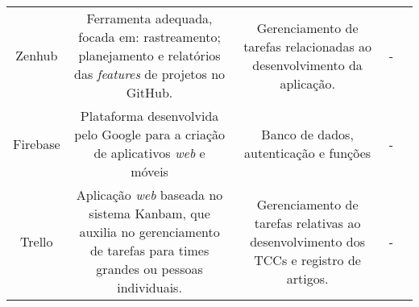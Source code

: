 \begin{table}[]
	\begin{tabular}{|c|c|c|c|c}
	\cline{1-4}
	\cellcolor[HTML]{EFEFEF}\begin{minipage} [t] {0.3\textwidth} \centering  Zenhub \cite{zenhub2020} \end{minipage} & \cellcolor[HTML]{EFEFEF}\begin{minipage} [t] {0.3\textwidth} \centering   Ferramenta adequada, focada em: rastreamento; planejamento e relatórios das \emph{features} de projetos no GitHub.   \end{minipage}             & \cellcolor[HTML]{EFEFEF}\begin{minipage} [t] {0.2\textwidth} \centering  Gerenciamento de tarefas relacionadas ao desenvolvimento da aplicação.  \end{minipage}  & \begin{minipage} [t] {0.1\textwidth} \centering  - \end{minipage} &  \\ \cline{1-4}
	\begin{minipage} [t] {0.3\textwidth} \centering  Firebase \cite{firebase2011} \end{minipage}                   & \begin{minipage} [t] {0.3\textwidth} \centering  Plataforma desenvolvida pelo Google para a criação de aplicativos \emph{web} e móveis\end{minipage}                & \begin{minipage} [t] {0.2\textwidth} \centering  Banco de dados, autenticação e funções  \end{minipage}                   & \begin{minipage} [t] {0.1\textwidth} \centering  - \end{minipage} &  \\ \cline{1-4}
	\begin{minipage} [t] {0.3\textwidth} \centering Trello \cite{trello2011} \end{minipage}                     & \begin{minipage} [t] {0.3\textwidth} \centering  Aplicação \emph{web} baseada no sistema Kanbam, que auxilia no gerenciamento de tarefas para times grandes ou pessoas individuais.   \end{minipage} 	& \begin{minipage} [t] {0.2\textwidth} \centering Gerenciamento de tarefas relativas ao desenvolvimento dos TCCs e registro de artigos. \end{minipage}	 & \begin{minipage} [t] {0.1\textwidth} \centering  - \end{minipage} &  \\ \cline{1-4}

\end{tabular}
\end{table}
